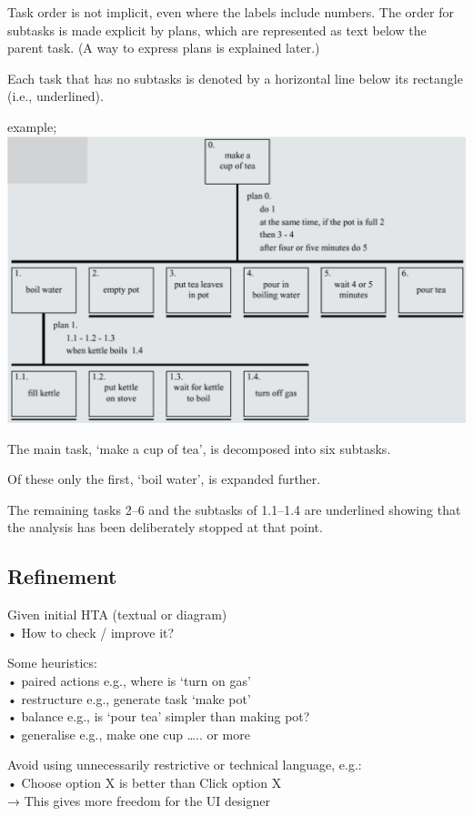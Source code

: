 \documentclass[]{project_plan}
\begin{document}
Task order is not implicit, even where the labels include numbers. The order for
subtasks is made explicit by plans, which
are represented as text below the parent
task. (A way to express plans is explained
later.)

Each task that has no subtasks is denoted
by a horizontal line below its rectangle (i.e.,
underlined).

example;\\
\includegraphics[width=\linewidth]{diagrammattic HTA.png}

The main task, ‘make a cup of tea’, is
decomposed into six subtasks.

Of these only the first, ‘boil water’, is
expanded further.

The remaining tasks 2–6 and the subtasks
of 1.1–1.4 are underlined showing that the
analysis has been deliberately stopped at
that point.

\subsection{Refinement}

Given initial HTA (textual or diagram)\\
• How to check / improve it?

Some heuristics:\\
• paired actions e.g., where is `turn on gas'\\
• restructure e.g., generate task `make pot'\\
• balance e.g., is `pour tea' simpler than making pot?\\
• generalise e.g., make one cup ….. or more

Avoid using unnecessarily restrictive or technical language, e.g.:\\
• Choose option X is better than Click option X\\
→ This gives more freedom for the UI designer
\end{document}
